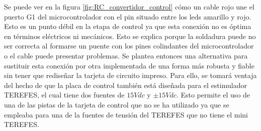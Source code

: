 Se puede ver en la figura \ref{fig:RC_convertidor_control} cómo un cable rojo une el puerto G1 del microcontrolador con el pin situado entre los leds amarillo y rojo. Esto es un punto débil en la etapa de control ya que esta conexión no es óptima en términos eléctricos ni mecánicos. Esto se explica porque la soldadura puede no ser correcta al formarse un puente con los pines colindantes del microcontrolador o el cable puede presentar problemas. Se plantea entonces una alternativa para sustituir esta conexión por otra implementada de una forma más robusta y fiable sin tener que rediseñar la tarjeta de circuito impreso. Para ello, se tomará ventaja del hecho de que la placa de control también está diseñada para el estimulador TEREFES, el cual tiene dos fuentes de $15Vdc$ y $\pm15Vdc$. Esto permite el uso de una de las pistas de la tarjeta de control que no se ha utilizado ya que se empleaba para una de la fuentes de tensión del TEREFES que no tiene el mini TEREFES.

